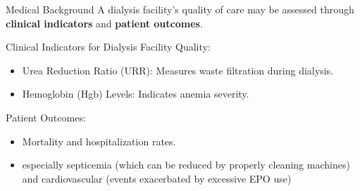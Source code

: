 \begin{frame}{Medical Background}
A dialysis facility’s quality of care may be assessed through \textbf{clinical indicators} and \textbf{patient outcomes}.

Clinical Indicators for Dialysis Facility Quality:
\begin{itemize}
    \item Urea Reduction Ratio (URR): Measures waste filtration during dialysis.
    \item Hemoglobin (Hgb) Levels: Indicates anemia severity.
\end{itemize}

Patient Outcomes:
\begin{itemize}
    \item Mortality and hospitalization rates.
    \item especially septicemia (which can be reduced by properly cleaning machines) and cardiovascular (events exacerbated by excessive EPO use)
\end{itemize}
\end{frame}